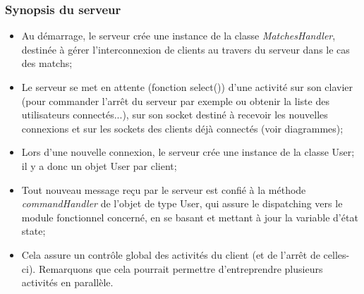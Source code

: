 \documentclass[a4paper,titlepage]{scrreprt}
\begin{document}
\subsubsection{Synopsis du serveur}
\begin{itemize}
  \item Au démarrage, le serveur crée une instance de la classe \emph{MatchesHandler}, destinée à gérer l'interconnexion
   de clients au travers du serveur dans le cas des matchs;
  \item Le serveur se met en attente (fonction select()) d'une activité sur son clavier
  (pour commander l'arrêt du serveur par exemple ou obtenir la liste des utilisateurs connectés...), sur
  son socket destiné à recevoir les nouvelles connexions et sur les sockets des clients déjà connectés (voir diagrammes);
  \item Lors d'une nouvelle connexion, le serveur crée une instance de la classe User; il y a donc un objet User par client;
  \item Tout nouveau message reçu par le serveur est confié à la méthode \emph{commandHandler} de l'objet de type User, qui assure le dispatching
  vers le module fonctionnel concerné, en se basant et mettant à jour la variable d'état state;
  \item Cela assure un contrôle global des activités du client (et de l'arrêt de celles-ci).
  Remarquons que cela pourrait permettre d'entreprendre plusieurs activités en parallèle.
\end{itemize}
\end{document}
